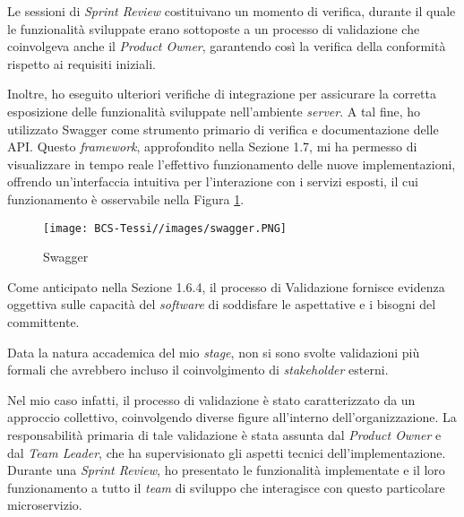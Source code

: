         \vspace{0.2 em}
        \noindent Le sessioni di \textit{Sprint Review} costituivano un momento di verifica, durante il quale le funzionalità sviluppate erano sottoposte a un processo di validazione che coinvolgeva anche il \textit{Product Owner}, garantendo così la verifica della conformità rispetto ai requisiti iniziali.

        \vspace{0.2 em}
        \noindent Inoltre, ho eseguito ulteriori verifiche di integrazione per assicurare la corretta esposizione delle funzionalità sviluppate nell'ambiente \textit{server}. A tal fine, ho utilizzato Swagger come strumento primario di verifica e documentazione delle API. Questo \textit{framework}, approfondito nella Sezione 1.7, mi ha permesso di visualizzare in tempo reale l'effettivo funzionamento delle nuove implementazioni, offrendo un'interfaccia intuitiva per l'interazione con i servizi esposti, il cui funzionamento è osservabile nella Figura \ref{fig:swagger}.
        
        \begin{figure}[H]
            \centering
            \texttt{[image: BCS-Tessi//images/swagger.PNG]}
            \caption{Swagger}
            \label{fig:swagger}
        \end{figure}

        \vspace{0.2 em}
        \noindent Come anticipato nella Sezione 1.6.4, il processo di Validazione fornisce evidenza oggettiva sulle capacità del \textit{software} di soddisfare le aspettative e i bisogni del committente. 

        \vspace{0.2 em}
        \noindent Data la natura accademica del mio \textit{stage}, non si sono svolte validazioni più formali che avrebbero incluso il coinvolgimento di \textit{stakeholder} esterni.

        \vspace{0.2 em}
        \noindent Nel mio caso infatti, il processo di validazione è stato caratterizzato da un approccio collettivo, coinvolgendo diverse figure all'interno dell'organizzazione. La responsabilità primaria di tale validazione è stata assunta dal \textit{Product Owner} e dal \textit{Team Leader}, che ha supervisionato gli aspetti tecnici dell'implementazione. Durante una \textit{Sprint Review}, ho presentato le funzionalità implementate e il loro funzionamento a tutto il \textit{team} di sviluppo che interagisce con questo particolare microservizio.


